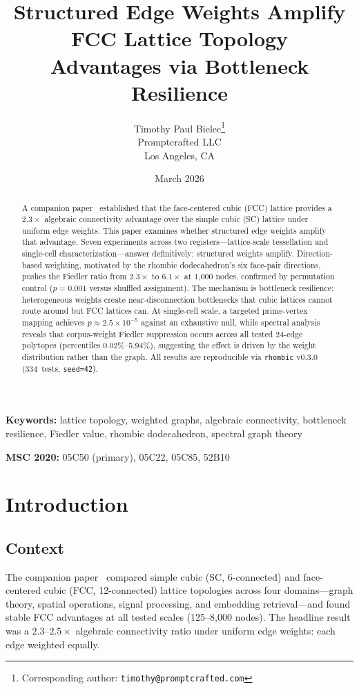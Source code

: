 \documentclass[11pt]{article}
\title{%
  Structured Edge Weights Amplify FCC Lattice Topology\\
  Advantages via Bottleneck Resilience%
}
\author{%
  Timothy Paul Bielec\thanks{Corresponding author: \texttt{timothy@promptcrafted.com}}\\
  Promptcrafted LLC\\
  Los Angeles, CA
}
\date{March 2026}
\begin{document}
\maketitle

\begin{abstract}
A companion paper~\cite{bielec2026shape} established that the
face-centered cubic (FCC) lattice provides a $2.3\times$ algebraic
connectivity advantage over the simple cubic (SC) lattice under
uniform edge weights. This paper examines whether structured edge
weights amplify that advantage. Seven experiments
across two registers---lattice-scale tessellation and single-cell
characterization---answer definitively: structured weights amplify.
Direction-based weighting, motivated by the rhombic dodecahedron's
six face-pair directions, pushes the Fiedler ratio from $2.3\times$
to $6.1\times$ at 1{,}000 nodes, confirmed by permutation control
($p = 0.001$ versus shuffled assignment). The mechanism is bottleneck
resilience: heterogeneous weights create near-disconnection
bottlenecks that cubic lattices cannot route around but FCC lattices
can. At single-cell scale, a targeted prime-vertex mapping achieves
$p \approx 2.5 \times 10^{-5}$ against an exhaustive null, while spectral analysis
reveals that corpus-weight Fiedler suppression occurs across all
tested 24-edge polytopes (percentiles 0.02\%--5.94\%), suggesting the
effect is driven by the weight distribution rather than the graph. All results are reproducible via \texttt{rhombic} v0.3.0
(334~tests, \texttt{seed=42}).
\end{abstract}

\noindent\textbf{Keywords:} lattice topology, weighted graphs,
algebraic connectivity, bottleneck resilience, Fiedler value,
rhombic dodecahedron, spectral graph theory

\smallskip\noindent\textbf{MSC 2020:} 05C50 (primary), 05C22, 05C85, 52B10

\section{Introduction}
\label{sec:intro}

\subsection{Context}

The companion paper~\cite{bielec2026shape} compared simple cubic
(SC, 6-connected) and face-centered cubic (FCC, 12-connected)
lattice topologies across four domains---graph theory, spatial
operations, signal processing, and embedding retrieval---and found
stable FCC advantages at all tested scales (125--8{,}000 nodes).
The headline result was a $2.3$--$2.5\times$ algebraic connectivity
ratio under uniform edge weights: each edge weighted equally.
\end{document}
